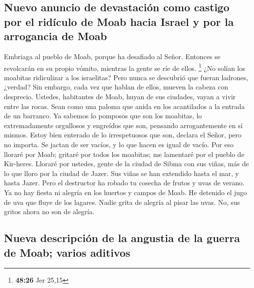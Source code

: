 \hypertarget{nuevo-anuncio-de-devastaciuxf3n-como-castigo-por-el-riduxedculo-de-moab-hacia-israel-y-por-la-arrogancia-de-moab}{%
\subsection{Nuevo anuncio de devastación como castigo por el ridículo de
Moab hacia Israel y por la arrogancia de
Moab}\label{nuevo-anuncio-de-devastaciuxf3n-como-castigo-por-el-riduxedculo-de-moab-hacia-israel-y-por-la-arrogancia-de-moab}}

 Embriaga al pueblo de Moab, porque ha desafiado al
Señor. Entonces se revolcarán en su propio vómito, mientras la gente se
ríe de ellos. \footnote{\textbf{48:26} Jer 25,15}  ¿No
solían los moabitas ridiculizar a los israelitas? Pero nunca se
descubrió que fueran ladrones, ¿verdad? Sin embargo, cada vez que hablan
de ellos, mueven la cabeza con desprecio.  Ustedes,
habitantes de Moab, huyan de sus ciudades, vayan a vivir entre las
rocas. Sean como una paloma que anida en los acantilados a la entrada de
un barranco.  Ya sabemos lo pomposos que son los
moabitas, lo extremadamente orgullosos y engreídos que son, pensando
arrogantemente en sí mismos.  Estoy bien enterado de lo
irrespetuosos que son, declara el Señor, pero no importa. Se jactan de
ser vacíos, y lo que hacen es igual de vacío.  Por eso
lloraré por Moab; gritaré por todos los moabitas; me lamentaré por el
pueblo de Kir-heres.  Lloraré por ustedes, gente de la
ciudad de Sibma con sus viñas, más de lo que lloro por la ciudad de
Jazer. Sus viñas se han extendido hasta el mar, y hasta Jazer. Pero el
destructor ha robado tu cosecha de frutos y uvas de verano.
 Ya no hay fiesta ni alegría en los huertos y campos de
Moab. He detenido el jugo de uva que fluye de los lagares. Nadie grita
de alegría al pisar las uvas. No, sus gritos ahora no son de alegría.

\hypertarget{nueva-descripciuxf3n-de-la-angustia-de-la-guerra-de-moab-varios-aditivos}{%
\subsection{Nueva descripción de la angustia de la guerra de Moab;
varios
aditivos}\label{nueva-descripciuxf3n-de-la-angustia-de-la-guerra-de-moab-varios-aditivos}}

